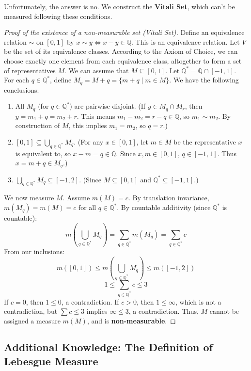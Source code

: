 Unfortunately, the answer is no. We construct the \textbf{Vitali Set}, which can’t be measured following these conditions.

\begin{proof}[Proof of the existence of a non-measurable set (Vitali Set)]
Define an equivalence relation $\sim$ on $[0,1]$ by $x \sim y \iff x-y \in \mathbb{Q}$.
This is an equivalence relation. Let $V$ be the set of its equivalence classes.
According to the Axiom of Choice, we can choose exactly one element from each equivalence class, altogether to form a set of representatives $M$. We can assume that $M \subseteq [0,1]$.
Let $\mathbb{Q}^* = \mathbb{Q} \cap [-1, 1]$. For each $q \in \mathbb{Q}^*$, define $M_q = M+q = \{m+q \mid m \in M\}$.
We have the following conclusions:
\begin{enumerate}
    \item All $M_q$ (for $q \in \mathbb{Q}^*$) are pairwise disjoint. (If $y \in M_q \cap M_r$, then $y = m_1+q = m_2+r$. This means $m_1 - m_2 = r-q \in \mathbb{Q}$, so $m_1 \sim m_2$. By construction of $M$, this implies $m_1=m_2$, so $q=r$.)
    \item $[0,1] \subseteq \bigcup_{q \in \mathbb{Q}^*} M_q$. (For any $x \in [0,1]$, let $m \in M$ be the representative $x$ is equivalent to, so $x-m = q \in \mathbb{Q}$. Since $x,m \in [0,1]$, $q \in [-1,1]$. Thus $x = m+q \in M_q$.)
    \item $\bigcup_{q \in \mathbb{Q}^*} M_q \subseteq [-1, 2]$. (Since $M \subseteq [0,1]$ and $\mathbb{Q}^* \subseteq [-1,1]$.)
\end{enumerate}
We now measure $M$. Assume $m(M) = c$.
By translation invariance, $m(M_q) = m(M) = c$ for all $q \in \mathbb{Q}^*$.
By countable additivity (since $\mathbb{Q}^*$ is countable):
$$ m\left(\bigcup_{q \in \mathbb{Q}^*} M_q\right) = \sum_{q \in \mathbb{Q}^*} m(M_q) = \sum_{q \in \mathbb{Q}^*} c $$
From our inclusions:
$$ m([0,1]) \le m\left(\bigcup_{q \in \mathbb{Q}^*} M_q\right) \le m([-1,2]) $$
$$ 1 \le \sum_{q \in \mathbb{Q}^*} c \le 3 $$
If $c = 0$, then $1 \le 0$, a contradiction.
If $c > 0$, then $1 \le \infty$, which is not a contradiction, but $\sum c \le 3$ implies $\infty \le 3$, a contradiction.
Thus, $M$ cannot be assigned a measure $m(M)$, and is \textbf{non-measurable}.
\end{proof}


\subsection*{Additional Knowledge: The Definition of Lebesgue Measure}

